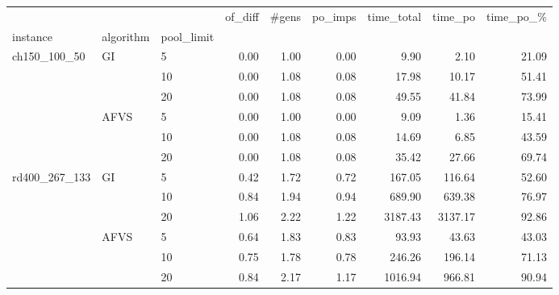 \begin{tabular}{lllrrrrrr}
\toprule
              &      &    &  of\_diff &  \#gens &  po\_imps &  time\_total &  time\_po &  time\_po\_\% \\
instance & algorithm & pool\_limit &          &        &          &             &          &            \\
\midrule
\multirow{6}{*}{ch150\_100\_50} & \multirow{3}{*}{GI} & 5  &     0.00 &   1.00 &     0.00 &        9.90 &     2.10 &      21.09 \\
              &      & 10 &     0.00 &   1.08 &     0.08 &       17.98 &    10.17 &      51.41 \\
              &      & 20 &     0.00 &   1.08 &     0.08 &       49.55 &    41.84 &      73.99 \\
\cline{2-9}
              & \multirow{3}{*}{AFVS} & 5  &     0.00 &   1.00 &     0.00 &        9.09 &     1.36 &      15.41 \\
              &      & 10 &     0.00 &   1.08 &     0.08 &       14.69 &     6.85 &      43.59 \\
              &      & 20 &     0.00 &   1.08 &     0.08 &       35.42 &    27.66 &      69.74 \\
\cline{1-9}
\cline{2-9}
\multirow{6}{*}{rd400\_267\_133} & \multirow{3}{*}{GI} & 5  &     0.42 &   1.72 &     0.72 &      167.05 &   116.64 &      52.60 \\
              &      & 10 &     0.84 &   1.94 &     0.94 &      689.90 &   639.38 &      76.97 \\
              &      & 20 &     1.06 &   2.22 &     1.22 &     3187.43 &  3137.17 &      92.86 \\
\cline{2-9}
              & \multirow{3}{*}{AFVS} & 5  &     0.64 &   1.83 &     0.83 &       93.93 &    43.63 &      43.03 \\
              &      & 10 &     0.75 &   1.78 &     0.78 &      246.26 &   196.14 &      71.13 \\
              &      & 20 &     0.84 &   2.17 &     1.17 &     1016.94 &   966.81 &      90.94 \\
\bottomrule
\end{tabular}
